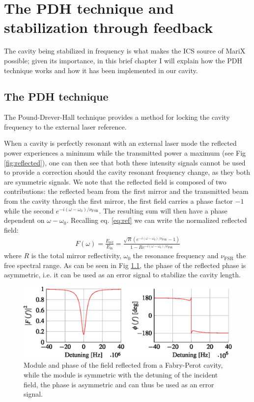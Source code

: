 \chapter[Stabilization through feedback]{The PDH technique and stabilization through feedback}
The cavity being stabilized in frequency is what makes the ICS source of MariX possible; given its importance, in this brief chapter I will explain how the PDH technique works and how it has been implemented in our cavity.

\section{The PDH technique}
The Pound-Drever-Hall technique \parencite{Black2001} provides a method for locking the cavity frequency to the external laser reference.

When a cavity is perfectly resonant with an external laser mode the reflected power experiences a minimum while the transmitted power a maximum (see Fig \ref{fig:reflected}), one can then see that both these intensity signals cannot be used to provide a correction should the cavity resonant frequency change, as they both are symmetric signals.
We note that the reflected field is composed of two contributions: the reflected beam from the first mirror and the transmitted beam from the cavity through the first mirror, the first field carries a phase factor $-1$ while the second $e^{-i(\omega-\omega_0)/\nu_\mathrm{FSR}}$. The resulting sum will then have a phase dependent on $\omega-\omega_0$. Recalling eq. \ref{eq:ref} we can write the normalized reflected field:
\begin{align}
	F(\omega) = \frac{E_\mathrm{ref}}{E_\mathrm{in}} = \frac{\sqrt{R} \left(e^{-i(\omega-\omega_0)/\nu_\mathrm{FSR}}-1\right)}{1-R e^{-i(\omega-\omega_0)/\nu_\mathrm{FSR}}}
\end{align}
where $R$ is the total mirror reflectivity, $\omega_0$ the resonance frequency and $\nu_{\mathrm{FSR}}$ the free spectral range. As can be seen in Fig \ref{fig:fomega}, the phase of the reflected phase is asymmetric, i.e. it can be used as an error signal to stabilize the cavity length.
\begin{figure}
	\centering
	\includegraphics[width=0.9\linewidth]{images/fomega.eps}
	\caption{Module and phase of the field reflected from a Fabry-Perot cavity, while the module is symmetric with the detuning of the incident field, the phase is asymmetric and can thus be used as an error signal.}
	\label{fig:fomega}
\end{figure}

